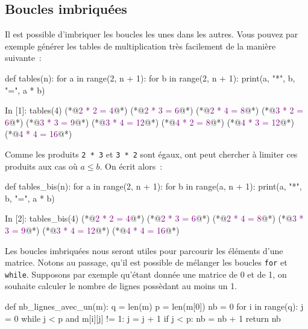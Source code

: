 \documentclass{magnolia}
\begin{document}
\subsection{Boucles imbriquées}

Il est possible d'imbriquer les boucles les unes dans les autres. Vous pouvez par exemple générer les tables de multiplication très facilement de la manière suivante~:

\begin{pythoncodeline}
def tables(n):
    for a in range(2, n + 1):
        for b in range(2, n + 1):
            print(a, "*", b, "=", a * b)
\end{pythoncodeline}
\begin{pythoncode}
In [1]: tables(4)
(*@\textcolor{purple}{2 * 2 = 4}@*)
(*@\textcolor{purple}{2 * 3 = 6}@*)
(*@\textcolor{purple}{2 * 4 = 8}@*)
(*@\textcolor{purple}{3 * 2 = 6}@*)
(*@\textcolor{purple}{3 * 3 = 9}@*)
(*@\textcolor{purple}{3 * 4 = 12}@*)
(*@\textcolor{purple}{4 * 2 = 8}@*)
(*@\textcolor{purple}{4 * 3 = 12}@*)
(*@\textcolor{purple}{4 * 4 = 16}@*)
\end{pythoncode}
Comme les produits \verb!2 * 3! et \verb!3 * 2! sont égaux, ont peut chercher à limiter
ces produits aux cas où $a \leq b$. On écrit alors~:
\begin{pythoncodeline}
def tables_bis(n):
    for a in range(2, n + 1):
        for b in range(a, n + 1):
            print(a, "*", b, "=", a * b)
\end{pythoncodeline}
\begin{pythoncode}
In [2]: tables_bis(4)
(*@\textcolor{purple}{2 * 2 = 4}@*)
(*@\textcolor{purple}{2 * 3 = 6}@*)
(*@\textcolor{purple}{2 * 4 = 8}@*)
(*@\textcolor{purple}{3 * 3 = 9}@*)
(*@\textcolor{purple}{3 * 4 = 12}@*)
(*@\textcolor{purple}{4 * 4 = 16}@*)
\end{pythoncode}

Les boucles imbriquées nous seront utiles pour parcourir les éléments d'une matrice. Notons au
passage, qu'il est possible de mélanger les boucles \verb!for! et \verb!while!.
Supposons par exemple qu'étant donnée une matrice de 0 et de 1, on souhaite calculer le
nombre de lignes possèdant au moins un 1.

\begin{pythoncodeline}
def nb_lignes_avec_un(m):
    q = len(m)
    p = len(m[0])
    nb = 0
    for i in range(q):
        j = 0
        while j < p and m[i][j] != 1:
            j = j + 1
        if j < p:
            nb = nb + 1
    return nb
\end{pythoncodeline}
\end{document}
